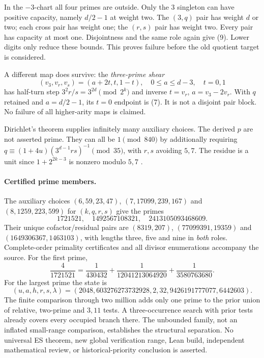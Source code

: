 \documentclass[10pt,a4paper]{article}
\begin{document}
In the $-3$-chart all four primes are outside. Only the $3$ singleton can have
positive capacity, namely $d/2-1$ at weight two. The $(3,q)$ pair has weight
$d$ or two; each cross pair has weight one; the $(r,s)$ pair has weight two.
Every pair has capacity at most one. Disjointness and the same role again give
(9). Lower digits only reduce these bounds. This proves failure before the old
quotient target is considered.

A different map does survive: the \emph{three-prime shear}
\[
(v_3,v_r,v_s)=(a+2t,t,1-t),\quad0\le a\le d-3,\quad t=0,1
\]
has half-turn step $3^2r/s=3^{2d}\pmod{2^k}$ and inverse
$t=v_r$, $a=v_3-2v_r$. With $q$ retained and $a=d/2-1$, its $t=0$ endpoint is
(7). It is not a disjoint pair block. No failure of all higher-arity maps is claimed.

Dirichlet's theorem supplies infinitely many auxiliary choices. The derived
$p$ are not asserted prime. They can all be $1\pmod{840}$ by additionally
requiring $q\equiv(1+4u)(3^{d-1}rs)^{-1}\pmod{35}$, with $r,s$ avoiding $5,7$.
The residue is a unit since $1+2^{2k-3}$ is nonzero modulo $5,7$ \cite{Dirichlet}.

\paragraph{Certified prime members.}
The auxiliary choices $(6,59,23,47)$, $(7,17099,239,167)$ and
$(8,1259,223,599)$ for $(k,q,r,s)$ give the primes
\[
1721521,\quad1492567108321,\quad2413105093468609.
\]
Their unique cofactor/residual pairs are
$(8319,207)$, $(77099391,19359)$ and $(1649306367,1463103)$, with lengths
three, five and nine in \emph{both} roles. Complete-order primality certificates
and all divisor enumerations accompany the source. For the first prime,
\[
\frac4{1721521}=\frac1{430432}+\frac1{12041213064920}+\frac1{3580763680}.
\]
For the largest prime the state is
\[
(u,a,h,r,s,\lambda)=(2048,603276273732928,2,32,9426191777077,6442603).
\]
The finite comparison through two million adds only one prime to the prior
union of relative, two-prime and $3,11$ tests. A three-occurrence search with
prior tests already covers every occupied branch there. The unbounded family,
not an inflated small-range comparison, establishes the structural separation.
No universal ES theorem, new global verification range, Lean build, independent
mathematical review, or historical-priority conclusion is asserted.
\end{document}

